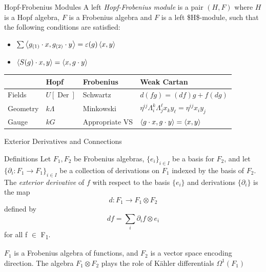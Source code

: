 \documentclass[presentation]{beamer}
\begin{document}
\begin{frame}[label={sec:orgb6b227b}]{Hopf-Frobenius Modules}
A left \emph{Hopf-Frobenius module} is a pair \((H,F)\) where \(H\) is a Hopf algebra, \(F\) is a Frobenius algebra and \(F\) is a left \$H\$-module, such that the following conditions are satisfied:

\bigskip

\begin{itemize}
\item {}  \(\sum \left\langle g_{(1)} \cdot x, g_{(2)} \cdot y \right\rangle = \varepsilon(g) \left\langle x,y \right\rangle\)

\item {}  \(\left\langle S(g) \cdot x, y \right\rangle = \left\langle x, g \cdot y \right\rangle\)
\end{itemize}


{\renewcommand{\arraystretch}{1.5}
\begin{center}
\begin{tabularx}{\textwidth}{lXXX}
 & Hopf & Frobenius & Weak Cartan\\
\hline
Fields & \(U[\operatorname{Der}]\) & Schwartz & \(d(fg) = (df)g + f(dg)\)\\
Geometry & \(k\Lambda\) & Minkowski & \(\eta^{ij}\Lambda^{k}_{i}\Lambda^{\ell}_{j} x_{k }y_{\ell} = \eta^{ij} x_{i} y_{j}\)\\
Gauge & \(kG\) & Appropriate VS & \(\left\langle g\cdot x, g\cdot y \right\rangle = \left\langle x, y \right\rangle\)\\
\end{tabularx}
\end{center}
}
\end{frame}
\begin{frame}[label={sec:org3cea3ee},fragile]{Exterior Derivatives and Connections}
 \begin{block}{Definitions}
Let \(F_{1}, F_{2}\) be Frobenius algebras, \(\{e_i\}_{i \in I}\) be a basis for \(F_2\), and let \(\{ \partial_i : F_{1} \to F_1 \}_{i \in I}\) be a collection of derivations on \(F_1\) indexed by the basis of \(F_2\). 
The  \emph{exterior derivative} of \(f\) with respect to the basis \(\{ e_i \}\) and derivations \(\{\partial_i \}\) is the map 
$$d: F_1 \to F_1 \otimes F_{2}$$
defined by
\[
df = \sum_i \partial_i f \otimes e_i
\]
for all f \(\in\) F\textsubscript{1}.

 \(F_1\) is a Frobenius algebra of functions, and \(F_2\) is a vector space encoding direction. The algebra \(F_1 \otimes F_2\) plays the role of Kähler differentials \(\Omega^1(F_1)\)
\end{block}
\end{frame}
\end{document}
